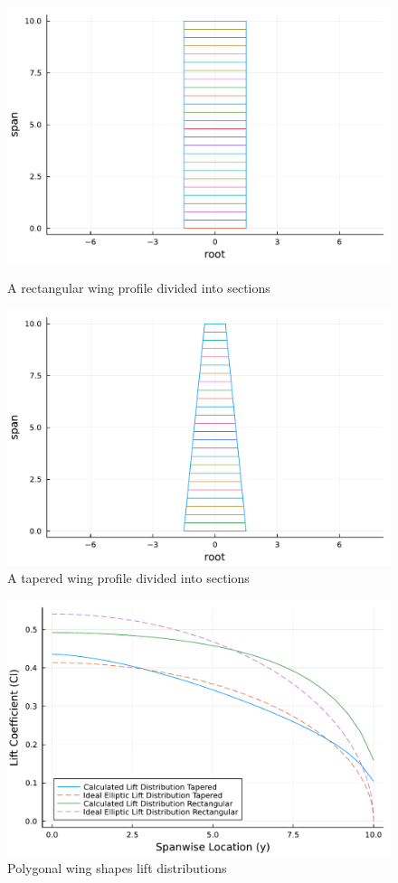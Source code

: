 \documentclass{article}
\begin{document}
\begin{figure}[h]
    \centering
\begin{minipage}[b]{0.45\textwidth}
\centering
\includegraphics[width=\textwidth]{Rectangular_wing_section_plot.pdf}
\caption{A rectangular wing profile divided into sections}
\label{fig:Rect Wing}
\end{minipage}
\begin{minipage}[b]{0.45\textwidth}
\centering
\includegraphics[width=\textwidth]{tapered_wing_section_plot.pdf}
\caption{A tapered wing profile divided into sections}
\label{fig:Tap Wing}
\end{minipage}
\end{figure}

\begin{figure}[h]
\centering
\includegraphics[width=.55\linewidth]{Lift_Distribution_along_the_Span_taper_Iteration.pdf}
\caption{\label{fig:Polygonal lift dist} Polygonal wing shapes lift distributions}
\end{figure}
\end{document}
